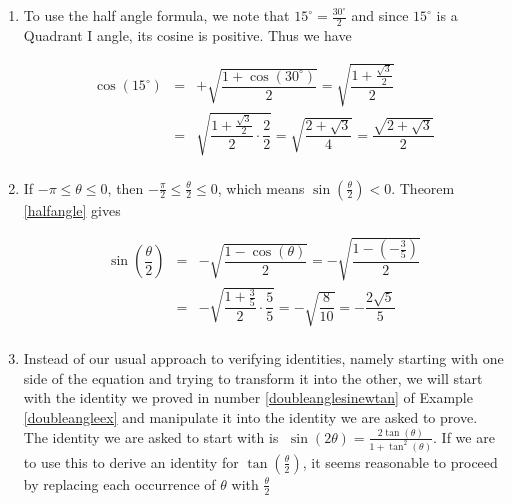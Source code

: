 {\begin{enumerate}

\item  To use the half angle formula, we note that $15^{\circ} = \frac{30^{\circ}}{2}$ and since $15^{\circ}$ is a Quadrant I angle, its cosine is positive.  Thus we have

\[ \begin{array}{rcl}

\cos\left(15^{\circ}\right) & = &  + \sqrt{\dfrac{1+\cos\left(30^{\circ}\right)}{2}} = \sqrt{\dfrac{1+\frac{\sqrt{3}}{2}}{2}}\\ [10pt] 
                          	& = & \sqrt{\dfrac{1+\frac{\sqrt{3}}{2}}{2}\cdot \dfrac{2}{2}} = \sqrt{\dfrac{2+\sqrt{3}}{4}} = \dfrac{\sqrt{2+\sqrt{3}}}{2}\\
\end{array}\]


\item  If $-\pi \leq \theta \leq 0$, then $-\frac{\pi}{2} \leq \frac{\theta}{2} \leq 0$, which means $\sin\left(\frac{\theta}{2}\right) < 0$.  Theorem \ref{halfangle} gives


\[ \begin{array}{rcl}

\sin\left(\dfrac{\theta}{2} \right) & = &  -\sqrt{\dfrac{1-\cos\left(\theta \right)}{2}} = -\sqrt{\dfrac{1- \left(-\frac{3}{5}\right)}{2}}\\ [10pt]
                          	& = & -\sqrt{\dfrac{1 + \frac{3}{5}}{2} \cdot \dfrac{5}{5}} = -\sqrt{\dfrac{8}{10}} =  -\dfrac{2\sqrt{5}}{5}\\
\end{array}\]

\item  Instead of our usual approach to verifying identities, namely starting with one side of the equation and trying to transform it into the other, we will start with the identity we proved in number \ref{doubleanglesinewtan} of Example \ref{doubleangleex} and manipulate it into the identity we are asked to prove.  The identity we are asked to start with is $\; \sin(2\theta) = \frac{2\tan(\theta)}{1 + \tan^{2}(\theta)}$.  If we are to use this to derive an identity for $\tan\left(\frac{\theta}{2}\right)$, it seems reasonable to proceed by replacing each occurrence of $\theta$ with $\frac{\theta}{2}$


\end{enumerate}}
